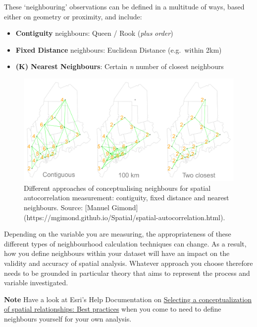 \documentclass[
]{book}
\providecommand{\tightlist}{%
  \setlength{\itemsep}{0pt}\setlength{\parskip}{0pt}}
\begin{document}
These `neighbouring' observations can be defined in a multitude of ways, based either on geometry or proximity, and include:

\begin{itemize}
\tightlist
\item
  \textbf{Contiguity} neighbours: Queen / Rook (\emph{plus order})
\item
  \textbf{Fixed Distance} neighbours: Euclidean Distance (e.g.~within 2km)
\item
  \textbf{(K) Nearest Neighbours}: Certain \emph{n} number of closest neighbours
\end{itemize}

\begin{figure}

{\centering \includegraphics[width=70.85in]{images/w07/iffn} 

}

\caption{Different approaches of conceptualising neighbours for spatial autocorrelation measurement: contiguity, fixed distance and nearest neighbours. Source: [Manuel Gimond](https://mgimond.github.io/Spatial/spatial-autocorrelation.html).}\label{fig:07-neighbours}
\end{figure}

Depending on the variable you are measuring, the appropriateness of these different types of neighbourhood calculation techniques can change. As a result, how you define neighbours within your dataset will have an impact on the validity and accuracy of spatial analysis. Whatever approach you choose therefore needs to be grounded in particular theory that aims to represent the process and variable investigated.

\textbf{Note}
Have a look at Esri's Help Documentation on \href{https://pro.arcgis.com/en/pro-app/latest/tool-reference/spatial-statistics/modeling-spatial-relationships.htm\#GUID-729B3B01-6911-41E9-AA99-8A4CF74EEE27}{Selecting a conceptualization of spatial relationships: Best practices} when you come to need to define neighbours yourself for your own analysis.
\end{document}
